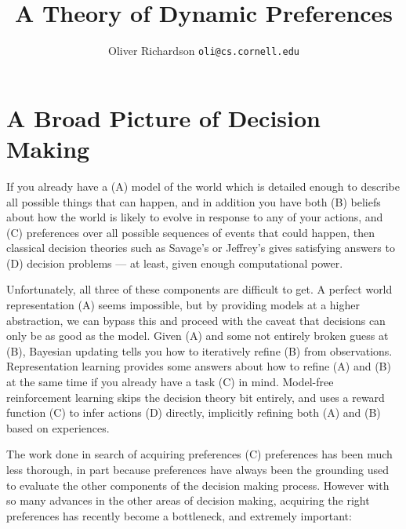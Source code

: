 \documentclass{article}
\title{A Theory of Dynamic Preferences}
\author{Oliver Richardson  \texttt{oli@cs.cornell.edu}}
\theoremstyle{plain}
\theoremstyle{definition}
\theoremstyle{remark}
\begin{document}
	\maketitle
	\section{A Broad Picture of Decision Making}
	If you already have a (A) model of the world which is detailed enough to describe all possible things that can happen, and in addition you have both (B) beliefs about how the world is likely to evolve in response to any of your actions, and (C) preferences over all possible sequences of events that could happen, then classical decision theories such as Savage's \cite{savage1972foundations} or Jeffrey's \cite{jeffrey1990logic} gives satisfying answers to (D) decision problems  --- at least, given enough computational power.
	
	Unfortunately, all three of these components are difficult to get. A perfect world representation (A) seems impossible, but by providing models at a higher abstraction, we can bypass this and proceed with the caveat that decisions can only be as good as the model. Given (A) and some not entirely broken guess at (B), Bayesian updating tells you how to iteratively refine (B) from observations. Representation learning provides some answers about how to refine (A) and (B) at the same time if you already have a task (C) in mind. Model-free reinforcement learning skips the decision theory bit entirely, and uses a reward function (C) to infer actions (D) directly, implicitly refining both (A) and (B) based on experiences.
		
	The work done in search of acquiring preferences (C) preferences has been much less thorough, in part because preferences have always been the grounding used to evaluate the other components of the decision making process. However with so many advances in the other areas of decision making, acquiring the right preferences has recently become a bottleneck, and extremely important: 
	
\end{document}
